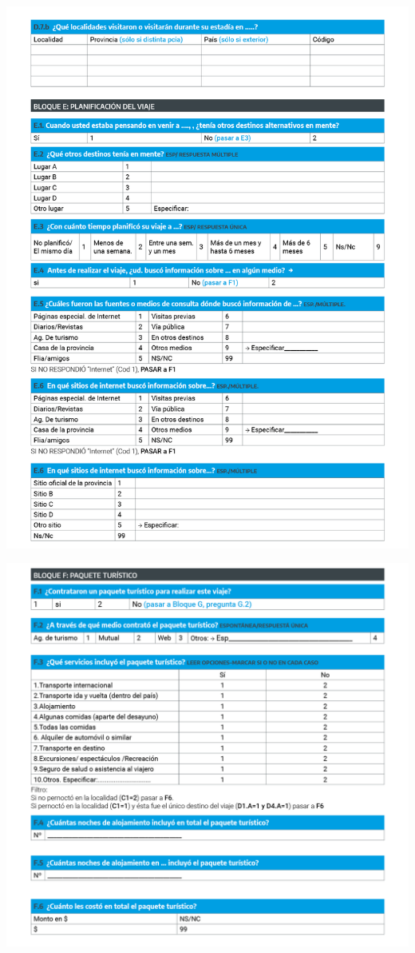 \documentclass[
]{book}
\begin{document}
\begin{center}\includegraphics[width=1\linewidth]{imagenes/graf07} \end{center}

\begin{center}\includegraphics[width=1\linewidth]{imagenes/graf08} \end{center}
\end{document}
